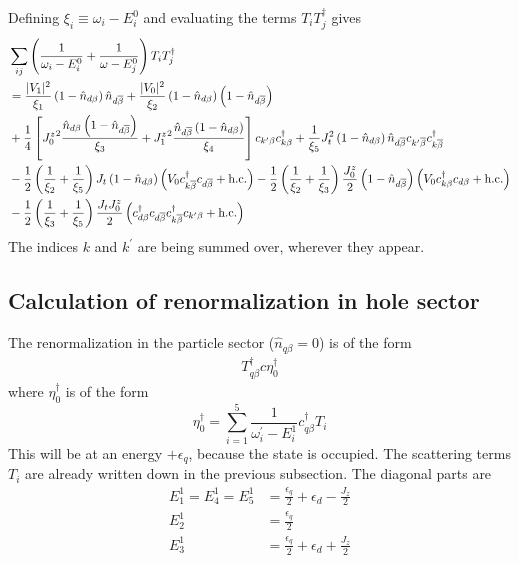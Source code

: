 \documentclass[12pt,twoside]{report}
\numberwithin{equation}{section}
\begin{document}
\pb Defining \(\xi_i \equiv \omega_i - E_i^0\) and evaluating the terms \(T_i T_j^\dagger\) gives
\begin{equation}\begin{aligned}
	&\sum_{ij} \left(\frac{1}{\omega_i - E^0_i} + \frac{1}{\omega - E^0_j}\right) T_i T_j^\dagger\\ 
	&=\frac{|V_1|^2}{\xi_1}\left( 1 - \hat n_{d\beta} \right) \hat n_{d\overline\beta} + \frac{|V_0|^2}{\xi_2}\left( 1 - \hat n_{d\beta} \right) \left( 1 - \hat n_{d\overline\beta} \right) \\
	&+ \frac{1}{4}\left[ {J_0^z}^2\frac{\hat n_{d\beta}\left( 1 - \hat n_{d\overline\beta} \right) }{\xi_3} + {J_1^z}^2\frac{\hat n_{d\overline\beta}\left( 1 - \hat n_{d\beta} \right)}{\xi_4} \right]c_{k^\prime\beta}c^\dagger_{k\beta} + \frac{1}{\xi_5}J_t^2 \left( 1 - \hat n_{d\beta} \right) \hat n_{d\overline\beta} c_{k^\prime\overline\beta}c^\dagger_{k\overline\beta} \\
	&- \frac{1}{2} \left(\frac{1}{\xi_2} + \frac{1}{\xi_5}\right)J_t\left( 1 - \hat n_{d\beta}\right) \left(V_0 c^\dagger_{k\overline\beta}c_{d\overline\beta} + \text{h.c.}\right) - \frac{1}{2}\left(\frac{1}{\xi_2} + \frac{1}{\xi_3}\right)\frac{J^z_0}{2}\left(1 - \hat n_{d\overline\beta}\right)\left(V_0 c^\dagger_{k\beta}c_{d\beta} + \text{h.c.}\right) \\
	&-\frac{1}{2}\left(\frac{1}{\xi_3} + \frac{1}{\xi_5}\right)\frac{J_t J^z_0}{2}\left(c^\dagger_{d\beta}c_{d\overline\beta}c^\dagger_{k\overline\beta}c_{k^\prime\beta} + \text{h.c.}\right)
\end{aligned}\end{equation}
The indices \(k\) and \(k^\prime\) are being summed over, wherever they appear.
\subsection{Calculation of renormalization in hole sector}
The renormalization in the particle sector (\(\hat n_{q\beta}=0\)) is of the form
\begin{equation}\begin{aligned}
	T^\dagger_{q\beta}c \eta_0^\dagger
\end{aligned}\end{equation}
where \(\eta_0^\dagger\) is of the form
\begin{equation}
	\eta_0^\dagger = \sum_{i=1}^5\frac{1}{\omega^\prime_i - E_i^1}c^\dagger_{q\beta} T_i
\end{equation}
This will be at an energy \(+\epsilon_q\), because the state is occupied. The scattering terms \(T_i\) are already written down in the previous subsection. The diagonal parts are
\begin{equation}\begin{aligned}
	E^1_1 = E^1_4 = E^1_5 &= \frac{\epsilon_q}{2} + \epsilon_d - \frac{J_z}{2}\\
	E^1_2 &= \frac{\epsilon_q}{2}\\
	E^1_3 &= \frac{\epsilon_q}{2} + \epsilon_d + \frac{J_z}{2} \\
\end{aligned}\end{equation}
\end{document}
